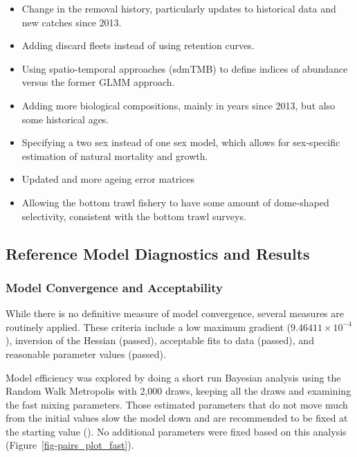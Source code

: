 \documentclass[
]{scrartcl}
\providecommand{\tightlist}{%
  \setlength{\itemsep}{0pt}\setlength{\parskip}{0pt}}\usepackage{longtable,booktabs,array}
\begin{document}
\begin{itemize}
\tightlist
\item
  Change in the removal history, particularly updates to historical data
  and new catches since 2013.
\item
  Adding discard fleets instead of using retention curves.
\item
  Using spatio-temporal approaches (sdmTMB) to define indices of
  abundance versus the former GLMM approach.
\item
  Adding more biological compositions, mainly in years since 2013, but
  also some historical ages.
\item
  Specifying a two sex instead of one sex model, which allows for
  sex-specific estimation of natural mortality and growth.
\item
  Updated and more ageing error matrices
\item
  Allowing the bottom trawl fishery to have some amount of dome-shaped
  selectivity, consistent with the bottom trawl surveys.
\end{itemize}

\newpage{}

\subsection{Reference Model Diagnostics and
Results}\label{reference-model-diagnostics-and-results}

\subsubsection{Model Convergence and
Acceptability}\label{model-convergence}

While there is no definitive measure of model convergence, several
measures are routinely applied. These criteria include a low maximum
gradient (\ensuremath{9.46411\times 10^{-4}}), inversion of the Hessian
(passed), acceptable fits to data (passed), and reasonable parameter
values (passed).

Model efficiency was explored by doing a short run Bayesian analysis
using the Random Walk Metropolis with 2,000 draws, keeping all the draws
and examining the fast mixing parameters. Those estimated parameters
that do not move much from the initial values slow the model down and
are recommended to be fixed at the starting value
(). No
additional parameters were fixed based on this analysis
(Figure~\ref{fig-pairs_plot_fast}).
\end{document}
